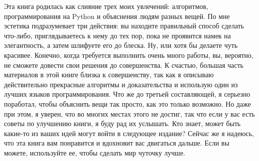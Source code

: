 Эта книга родилась как слияние трех моих увлечений: алгоритмов, программирования на Python и объяснения людям разных вещей. По мне эстетика подразумевает три действия: вы находите правильный способ сделать что-либо, приглядываетесь к нему до тех пор, пока не проявится намек на элегантность, а затем шлифуете его до блеска. Ну, или хотя бы делаете чуть красивее. Конечно, когда требуется выполнить очень много работы, вы, вероятно, не сможете довести свои решения до совершенства. К счастью, большая часть материалов в этой книге близка к совершенству, так как я описываю действительно прекрасные алгоритмы и доказательства и использую один из лучших языков программирования. Что же до третьей составляющей, я серьезно поработал, чтобы объяснить вещи так просто, как это только возможно. Но даже при этом, я уверен, что во многих местах этого не достиг, так что если у вас есть советы по улучшению книги, я буду рад их услышать. Кто знает, может быть какие-то из ваших идей могут войти в следующее издание? Сейчас же я надеюсь, что эта книга вам понравится и вдохновит вас двигаться дальше. Если вы можете, используйте ее, чтобы сделать мир чуточку лучше.
